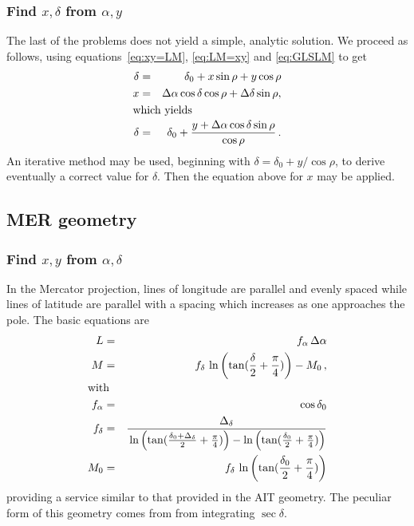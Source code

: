 \subsubsection{Find $x,\delta$ from $\alpha,y$}

     The last of the problems does not yield a simple, analytic
solution.  We proceed as follows, using equations~\ref{eq:xy=LM},
\ref{eq:LM=xy} and \ref{eq:GLSLM} to get
\begin{eqnarray*}
   \delta & = &\delta_0+x\sin\rho+y\cos\rho \\
   x      & = &\da\cos\delta\cos\rho+\Delta\delta\sin\rho, \\
\noalign{\hbox{which yields}}
   \delta & = &\delta_0 + \frac{y+\da\cos\delta\sin\rho}{\cos\rho} \, .
\end{eqnarray*}
An iterative method may be used, beginning with $\delta =
\delta_0+y/\cos\rho$, to derive eventually a correct value for
$\delta$.  Then the equation above for $x$ may be applied.

\subsection{MER geometry\protect\footnotemark}

\subsubsection{Find $x,y$ from $\alpha,\delta$}

     In the Mercator projection, lines of longitude are parallel and
evenly spaced while lines of latitude are parallel with a spacing
which increases as one approaches the pole.  The basic equations are
\begin{eqnarray}
   L & = & \fa\,\da \nonumber \\
   M & = & \fd\,\ln\left(\tan(\frac{\delta}{2} + \frac{\pi}{4})\right)
              - M_0 \, , \label{eq:MERLM} \\
\noalign{\hbox{with}}
   \fa & = &\cos\delta_0 \nonumber \\
   \fd & = &\frac{\Dd}{\strut\ln\left(\tan(\frac{\mathstrut\delta_0 +
              \Dd}{2} + \frac{\pi}{4})\right) - \ln\left(\tan
              (\frac{\mathstrut\delta_0}{2} + \frac{\pi}{4})\right)}
              \nonumber \\
   M_0 & = &\fd\,\ln\left(\tan(\frac{\delta_0}{2} + \frac{\pi}{4})
               \right) \nonumber
\end{eqnarray}
providing a service similar to that provided in the AIT geometry.  The
peculiar form of this geometry comes from from integrating
$\sec\delta$.


